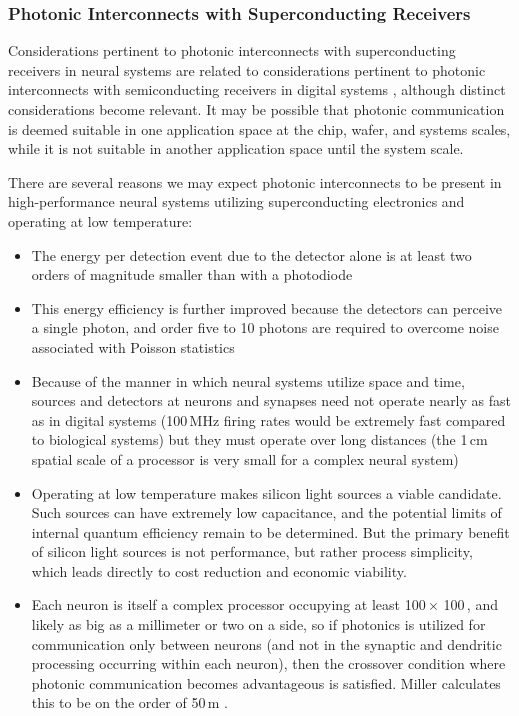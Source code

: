 \subsubsection{Photonic Interconnects with Superconducting Receivers}
Considerations pertinent to photonic interconnects with superconducting receivers in neural systems are related to considerations pertinent to photonic interconnects with semiconducting receivers in digital systems \cite{mi2009,mi2017}, although distinct considerations become relevant. It may be possible that photonic communication is deemed suitable in one application space at the chip, wafer, and systems scales, while it is not suitable in another application space until the system scale. 

\vspace{3em}
There are several reasons we may expect photonic interconnects to be present in high-performance neural systems utilizing superconducting electronics and operating at low temperature:
\begin{itemize}
\item The energy per detection event due to the detector alone is at least two orders of magnitude smaller than with a photodiode
\item This energy efficiency is further improved because the detectors can perceive a single photon, and order five to 10 photons are required to overcome noise associated with Poisson statistics
\item Because of the manner in which neural systems utilize space and time, sources and detectors at neurons and synapses need not operate nearly as fast as in digital systems (100\,MHz firing rates would be extremely fast compared to biological systems) but they must operate over long distances (the 1\,cm spatial scale of a processor is very small for a complex neural system)
\item Operating at low temperature makes silicon light sources a viable candidate. Such sources can have extremely low capacitance, and the potential limits of internal quantum efficiency remain to be determined. But the primary benefit of silicon light sources is not performance, but rather process simplicity, which leads directly to cost reduction and economic viability.
\item Each neuron is itself a complex processor occupying at least 100\,\textmu $\times$ 100\,\textmu, and likely as big as a millimeter or two on a side, so if photonics is utilized for communication only between neurons (and not in the synaptic and dendritic processing occurring within each neuron), then the crossover condition where photonic communication becomes advantageous is satisfied. Miller calculates this to be on the order of 50\,\textmu m \cite{mi2009}.
\end{itemize}

